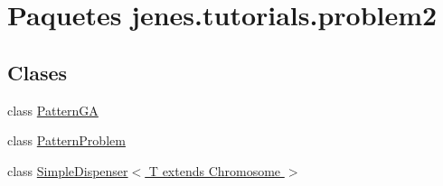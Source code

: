\hypertarget{namespacejenes_1_1tutorials_1_1problem2}{\section{Paquetes jenes.\-tutorials.\-problem2}
\label{namespacejenes_1_1tutorials_1_1problem2}
}
\subsection*{Clases}
\begin{DoxyCompactItemize}
\item 
class \hyperlink{classjenes_1_1tutorials_1_1problem2_1_1_pattern_g_a}{Pattern\-G\-A}
\item 
class \hyperlink{classjenes_1_1tutorials_1_1problem2_1_1_pattern_problem}{Pattern\-Problem}
\item 
class \hyperlink{classjenes_1_1tutorials_1_1problem2_1_1_simple_dispenser_3_01_t_01extends_01_chromosome_01_4}{Simple\-Dispenser$<$ T extends Chromosome $>$}
\end{DoxyCompactItemize}
